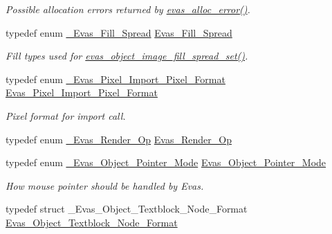 \begin{DoxyCompactItemize}
\begin{DoxyCompactList}\small\item\em Possible allocation errors returned by \hyperlink{group__Evas__Group_ga1c782b4511e3b8678a2166c651053ac9}{evas\_\-alloc\_\-error()}. \item\end{DoxyCompactList}\item 
typedef enum \hyperlink{Evas_8h_a830349cff0c676505905e79e1db0f738}{\_\-Evas\_\-Fill\_\-Spread} \hyperlink{Evas_8h_a693bc9123af8452d9771c2a849b8805c}{Evas\_\-Fill\_\-Spread}\label{Evas_8h_a693bc9123af8452d9771c2a849b8805c}

\begin{DoxyCompactList}\small\item\em Fill types used for \hyperlink{group__Evas__Object__Image_ga0015a660507a5562e118a1777947f881}{evas\_\-object\_\-image\_\-fill\_\-spread\_\-set()}. \item\end{DoxyCompactList}\item 
typedef enum \hyperlink{Evas_8h_a8f3b6286e8954884b903666f50e12b59}{\_\-Evas\_\-Pixel\_\-Import\_\-Pixel\_\-Format} \hyperlink{Evas_8h_ae609d856d391e1d65968a137313e0eb7}{Evas\_\-Pixel\_\-Import\_\-Pixel\_\-Format}
\begin{DoxyCompactList}\small\item\em Pixel format for import call. \item\end{DoxyCompactList}\item 
typedef enum \hyperlink{group__Evas__Object__Group__Extras_ga551375283a5e2b0abffd5f40582e9ce2}{\_\-Evas\_\-Render\_\-Op} \hyperlink{group__Evas__Object__Group__Extras_ga9c39a3ca795bbec3687fae9ee67d6056}{Evas\_\-Render\_\-Op}
\item 
typedef enum \hyperlink{group__Evas__Object__Group__Extras_ga822b2a69896ff21279debe2a417e3082}{\_\-Evas\_\-Object\_\-Pointer\_\-Mode} \hyperlink{group__Evas__Object__Group__Extras_ga27baac4c63b590de109e3e3f0d941483}{Evas\_\-Object\_\-Pointer\_\-Mode}
\begin{DoxyCompactList}\small\item\em How mouse pointer should be handled by Evas. \item\end{DoxyCompactList}\item 
typedef struct \_\-Evas\_\-Object\_\-Textblock\_\-Node\_\-Format \hyperlink{Evas_8h_adcd2409468741c89d607f06e17da1f64}{Evas\_\-Object\_\-Textblock\_\-Node\_\-Format}\label{Evas_8h_adcd2409468741c89d607f06e17da1f64}


\end{DoxyCompactItemize}
